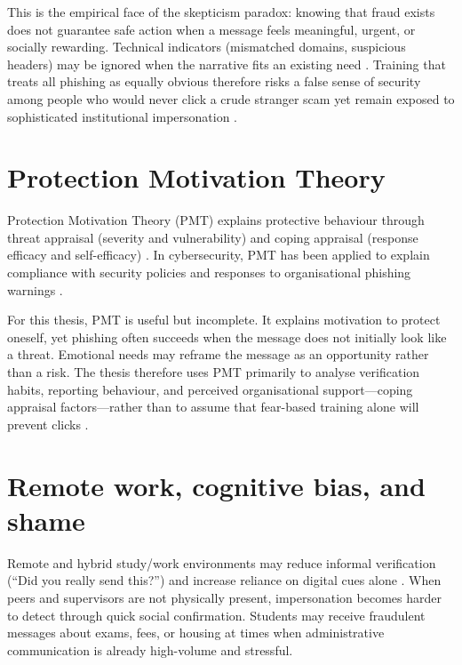 \documentclass[UKenglish,12pt]{master-style}
\begin{document}
This is the empirical face of the skepticism paradox: knowing that fraud exists does not guarantee safe action when a message feels meaningful, urgent, or socially rewarding. Technical indicators (mismatched domains, suspicious headers) may be ignored when the narrative fits an existing need \parencite{tsai2021phishing,parker2020contributing}. Training that treats all phishing as equally obvious therefore risks a false sense of security among people who would never click a crude stranger scam yet remain exposed to sophisticated institutional impersonation \parencite{tjostheim2022crt}.

\section{Protection Motivation Theory}

Protection Motivation Theory (PMT) explains protective behaviour through threat appraisal (severity and vulnerability) and coping appraisal (response efficacy and self-efficacy) \parencite{rogers1975pmt,floyd2000pmt}. In cybersecurity, PMT has been applied to explain compliance with security policies and responses to organisational phishing warnings \parencite{baylsmith2024phishing}.

For this thesis, PMT is useful but incomplete. It explains motivation to protect oneself, yet phishing often succeeds when the message does not initially look like a threat. Emotional needs may reframe the message as an opportunity rather than a risk. The thesis therefore uses PMT primarily to analyse verification habits, reporting behaviour, and perceived organisational support---coping appraisal factors---rather than to assume that fear-based training alone will prevent clicks \parencite{chen2024roleplaying}.

\section{Remote work, cognitive bias, and shame}

Remote and hybrid study/work environments may reduce informal verification (``Did you really send this?'') and increase reliance on digital cues alone \parencite{jts2024remote}. When peers and supervisors are not physically present, impersonation becomes harder to detect through quick social confirmation. Students may receive fraudulent messages about exams, fees, or housing at times when administrative communication is already high-volume and stressful.
\end{document}

